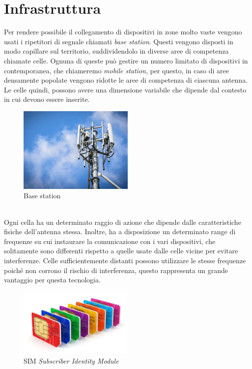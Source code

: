 \section{Infrastruttura}
Per rendere possibile il collegamento di dispositivi in zone molto vaste vengono usati i ripetitori di segnale chiamati \textit{base station}. 
Questi vengono disposti in modo capillare sul territorio, suddividendolo in diverse aree di competenza chiamate celle. Ognuna di queste può gestire
un numero limitato di dispositivi in contemporanea, che chiameremo \textit{mobile station}, per questo, in caso di aree densamente popolate vengono 
ridotte le aree di competenza di ciascuna antenna. Le celle quindi, possono avere una dimensione variabile che dipende dal contesto in cui devono essere inserite.
\begin{figure}[h]
    \centering
    \includegraphics[width=0.5\textwidth]{images/base-station.jpg}
    \caption{Base station}
\end{figure}\\
Ogni cella ha un determinato raggio di azione che dipende dalle caratteristiche fisiche dell'antenna stessa. Inoltre, 
ha a disposizione un determinato range di frequenze su cui instaurare la comunicazione con i vari dispositivi, che solitamente
sono differenti rispetto a quelle usate dalle celle vicine per evitare interferenze.
Celle sufficientemente distanti possono utilizzare le stesse frequenze poiché non corrono il rischio di interferenza, questo rappresenta
un grande vantaggio per questa tecnologia.
\begin{figure}[h]
    \centering
    \includegraphics[width=0.5\textwidth]{images/simcard.jpg}
    \caption{SIM \textit{Subscriber Identity Module}}
\end{figure}

